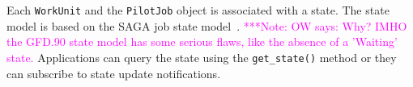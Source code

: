 \documentclass[conference,final]{IEEEtran}
\newcommand{\alnote}[1]{ {\textcolor{blue} { ***andrel: #1 }}}
\newcommand{\note}[1]{ {\textcolor{magenta} { ***Note: #1 }}}
\newcommand{\alnote}[1]{}
\newcommand{\note}[1]{}
\begin{document}
Each \texttt{WorkUnit} and the \texttt{PilotJob} object is associated with a
state. The state model is based on the SAGA job state
model~\cite{ogf-gfd-90}.
\note{OW says: Why? IMHO the GFD.90 state model has some serious flaws, like
the absence of a 'Waiting' state.} 
Applications can query the state using the \texttt{get\_state()} method or they
can subscribe to state update notifications.



\end{document}
